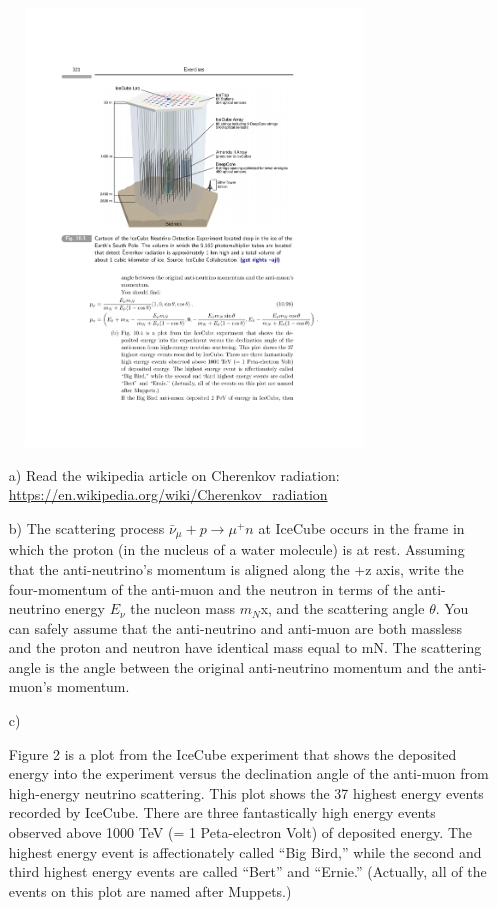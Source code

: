 {\begin{figure}[h!]
\centering
\includegraphics[width=0.8\textwidth]{./Icecube.pdf}
\caption{}
\end{figure}


\begin{itemize}
\item[a)]{Read the wikipedia article on Cherenkov radiation:  \href{https://en.wikipedia.org/wiki/Cherenkov_radiation}{https://en.wikipedia.org/wiki/Cherenkov\_radiation}}
\item[b)]{
The scattering process $\bar{\nu}_\mu + p \rightarrow \mu^+ n $ at IceCube occurs in the frame in which the proton (in the nucleus of a water molecule) is at rest. 
Assuming that the anti-neutrino’s momentum is aligned along the +z axis, write the four-momentum of the anti-muon and the neutron in terms of the anti-neutrino energy $E_\nu$ the nucleon mass $m_N$x, and the scattering angle $\theta$. 
You can safely assume that the anti-neutrino and anti-muon are both massless and the proton and neutron have identical mass equal to mN. 
The scattering angle is the angle between the original anti-neutrino momentum and the anti-muon’s momentum.
}
\item[c)]{
Figure 2 is a plot from the IceCube experiment that shows the deposited energy into the experiment versus the declination angle of the anti-muon from high-energy neutrino scattering. 
This plot shows the 37 highest energy events recorded by IceCube. 
There are three fantastically high energy events observed above 1000 TeV (= 1 Peta-electron Volt) of deposited energy. 
The highest energy event is affectionately called “Big Bird,” while the second and third highest energy events are called “Bert” and “Ernie.” 
(Actually, all of the events on this plot are named after Muppets.)

}
\end{itemize}}
